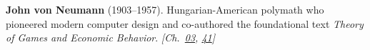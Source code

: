 \textbf{John von Neumann} (1903–1957). Hungarian-American polymath who pioneered modern computer design and co-authored the foundational text \emph{Theory of Games and Economic Behavior}. \emph{[Ch.~\hyperref[ch:banach]{03}, \hyperref[ch:hough]{41}]}

